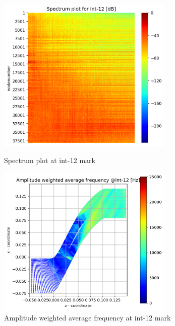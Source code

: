 \begin{figure}[ht]
  \centering
  \includegraphics[width=0.75\textwidth]{Figures/int-12_spectrum.png}
  \caption{Spectrum plot at int-12 mark} \label{int-12-spectrum}
  
  \vspace*{\floatsep}%

  \includegraphics[width=0.75\textwidth]{Figures/int-12-awaf.png}
  \caption{Amplitude weighted average frequency at int-12 mark} \label{int-12-awaf}
\end{figure}
